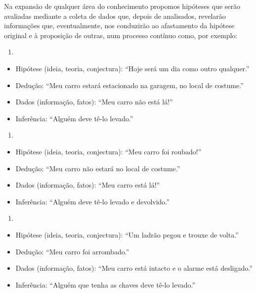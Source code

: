 \documentclass[
]{book}
\providecommand{\tightlist}{%
  \setlength{\itemsep}{0pt}\setlength{\parskip}{0pt}}
\begin{document}
Na expansão de qualquer área do conhecimento propomos hipóteses que serão avaliadas mediante a coleta de dados que, depois de analisados, revelarão informações que, eventualmente, nos conduzirão ao afastamento da hipótese original e à proposição de outras, num processo contínuo como, por exemplo:

\begin{enumerate}
\def\labelenumi{(\Alph{enumi})}
\tightlist
\item
\end{enumerate}

\begin{itemize}
\tightlist
\item
  Hipótese (ideia, teoria, conjectura): ``Hoje será um dia como outro qualquer.''
\item
  Dedução: ``Meu carro estará estacionado na garagem, no local de costume.''
\item
  Dados (informação, fatos): ``Meu carro não está lá!''
\item
  Inferência: ``Alguém deve tê-lo levado.''
\end{itemize}

\begin{enumerate}
\def\labelenumi{(\Alph{enumi})}
\setcounter{enumi}{1}
\tightlist
\item
\end{enumerate}

\begin{itemize}
\tightlist
\item
  Hipótese (ideia, teoria, conjectura): ``Meu carro foi roubado!''
\item
  Dedução: ``Meu carro não estará no local de costume.''
\item
  Dados (informação, fatos): ``Meu carro está lá!''
\item
  Inferência: ``Alguém deve tê-lo levado e devolvido.''
\end{itemize}

\begin{enumerate}
\def\labelenumi{(\Alph{enumi})}
\setcounter{enumi}{2}
\tightlist
\item
\end{enumerate}

\begin{itemize}
\tightlist
\item
  Hipótese (ideia, teoria, conjectura): ``Um ladrão pegou e trouxe de volta.''
\item
  Dedução: ``Meu carro foi arrombado.''
\item
  Dados (informação, fatos): ``Meu carro está intacto e o alarme está desligado.''
\item
  Inferência: ``Alguém que tenha as chaves deve tê-lo levado.''
\end{itemize}
\end{document}
